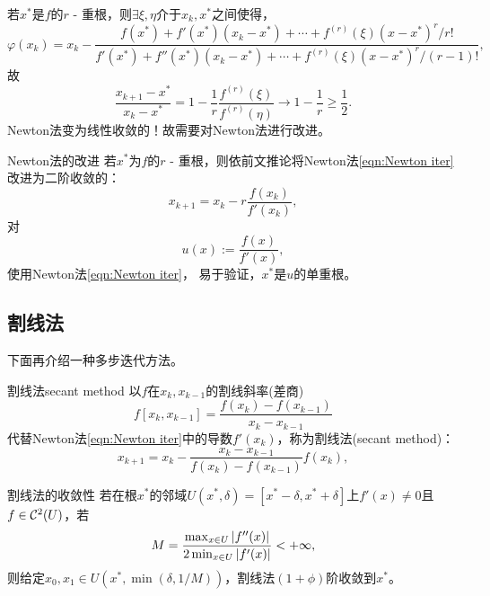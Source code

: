 \begin{corollary}
    若$x^*$是$f$的$r$ - 重根，则$\exists\xi,\eta$介于$x_k,x^*$之间使得，
    \[
        \varphi(x_k)=x_k-\frac{f(x^*)+f'(x^*)(x_k-x^*)+\cdots+f^{(r)}(\xi)(x-x^*)^r/r!}{f'(x^*)+f''(x^*)(x_k-x^*)+\cdots+f^{(r)}(\xi)(x-x^*)^r/(r-1)!},
    \]
    故
    \[
        \frac{x_{k+1}-x^*}{x_k-x^*}=1-\frac1r\frac{f^{(r)}(\xi)}{f^{(r)}(\eta)}\to1-\frac1r\geq\frac12.
    \]
    Newton法变为线性收敛的！故需要对Newton法进行改进。
\end{corollary}

\begin{theorem}
    {Newton法的改进}{}
    若$x^*$为$f$的$r$ - 重根，则依前文推论将Newton法\eqref{eqn:Newton iter}改进为二阶收敛的： 
    \begin{equation}
        \label{eqn:Newton iter r-multiroot}
        x_{k+1}=x_k-r\frac{f(x_k)}{f'(x_k)},
    \end{equation}
    \tcblower
    对
    \begin{equation}
        u(x):=\frac{f(x)}{f'(x)},
    \end{equation}
    使用Newton法\eqref{eqn:Newton iter}，
    易于验证，$x^*$是$u$的单重根。
\end{theorem}

\subsection{割线法}

下面再介绍一种多步迭代方法。

\begin{theorem}
    {割线法}{secant method}
    以$f$在$x_k,x_{k-1}$的割线斜率(差商)
    \[
        f[x_k,x_{k-1}]=\frac{f(x_k)-f(x_{k-1})}{x_k-x_{k-1}}
    \]
    代替Newton法\eqref{eqn:Newton iter}中的导数$f'(x_k)$，称为割线法(secant method)：
    \begin{equation}
        \label{eqn:secant line}
        x_{k+1}=x_k-\frac{x_k-x_{k-1}}{f(x_k)-f(x_{k-1})}f(x_k),
    \end{equation}
\end{theorem}

\begin{theorem}
    {割线法的收敛性}{}
    若在根$x^*$的邻域$U(x^*,\delta)=[x^*-\delta,x^*+\delta]$上$f'(x)\neq 0$且$f\in\mathcal C^2(U)$，若
    \[
        M=\frac{\max_{x\in U}\left\lvert f''(x)\right\rvert}{2\min_{x\in U}\left\lvert f'(x)\right\rvert}<+\infty,
    \]
    则给定$x_0,x_1\in U(x^*,\min(\delta,1/M))$，割线法$(1+\phi)$阶收敛到$x^*$。
\end{theorem}

